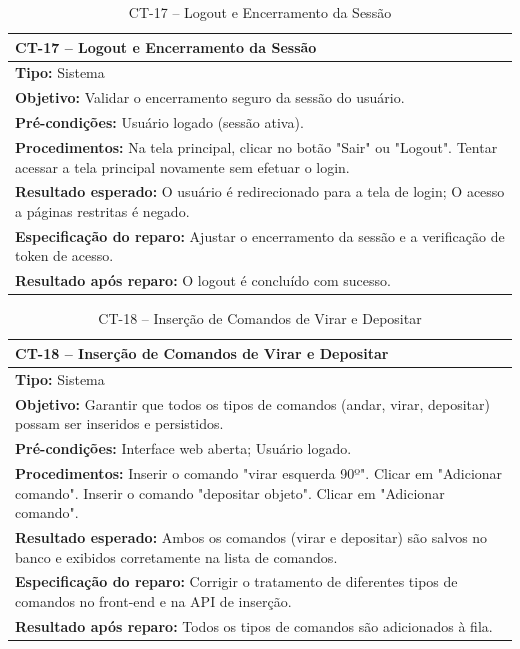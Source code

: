 
\begin{table}[H]
\centering
\begin{tabular}{|p{}|}
\hline
\textbf{CT-17 – Logout e Encerramento da Sessão} \\ \hline
\textbf{Tipo:} Sistema \\ \hline
\textbf{Objetivo:} Validar o encerramento seguro da sessão do usuário. \\ \hline
\textbf{Pré-condições:} Usuário logado (sessão ativa). \\ \hline
\textbf{Procedimentos:} Na tela principal, clicar no botão "Sair" ou "Logout". Tentar acessar a tela principal novamente sem efetuar o login. \\ \hline
\textbf{Resultado esperado:} O usuário é redirecionado para a tela de login; O acesso a páginas restritas é negado. \\ \hline
\textbf{Especificação do reparo:} Ajustar o encerramento da sessão e a verificação de token de acesso. \\ \hline
\textbf{Resultado após reparo:} O logout é concluído com sucesso. \\ \hline
\end{tabular}
\caption{CT-17 – Logout e Encerramento da Sessão}
\end{table}


\begin{table}[H]
\centering
\begin{tabular}{|p{}|}
\hline
\textbf{CT-18 – Inserção de Comandos de Virar e Depositar} \\ \hline
\textbf{Tipo:} Sistema \\ \hline
\textbf{Objetivo:} Garantir que todos os tipos de comandos (andar, virar, depositar) possam ser inseridos e persistidos. \\ \hline
\textbf{Pré-condições:} Interface web aberta; Usuário logado. \\ \hline
\textbf{Procedimentos:} Inserir o comando "virar esquerda 90º". Clicar em "Adicionar comando". Inserir o comando "depositar objeto". Clicar em "Adicionar comando". \\ \hline
\textbf{Resultado esperado:} Ambos os comandos (virar e depositar) são salvos no banco e exibidos corretamente na lista de comandos. \\ \hline
\textbf{Especificação do reparo:} Corrigir o tratamento de diferentes tipos de comandos no front-end e na API de inserção. \\ \hline
\textbf{Resultado após reparo:} Todos os tipos de comandos são adicionados à fila. \\ \hline
\end{tabular}
\caption{CT-18 – Inserção de Comandos de Virar e Depositar}
\end{table}

